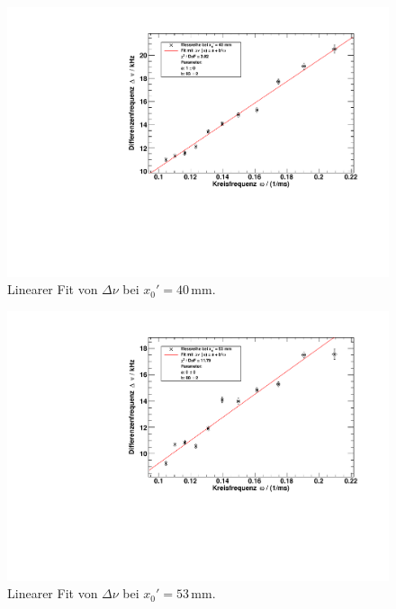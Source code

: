 \begin{figure}[H]
\begin{center}
  \includegraphics[width=\textwidth]{../img/fit_x0_40mm.pdf}
  \caption{Linearer Fit von $\Delta \nu$ bei $x_0' = 40$\,mm.}
  \label{img:fit:T:40mm}
\end{center}
\end{figure}

\begin{figure}[H]
\begin{center}
  \includegraphics[width=\textwidth]{../img/fit_x0_53mm.pdf}
  \caption{Linearer Fit von $\Delta \nu$ bei $x_0' = 53$\,mm.}
  \label{img:fit:T:53mm}
\end{center}
\end{figure}

